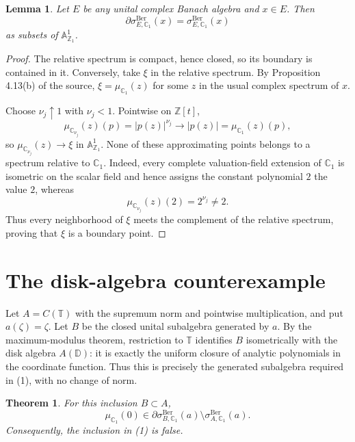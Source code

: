 \documentclass[11pt,a4paper]{article}
\newtheorem{theorem}{Theorem}
\newtheorem{lemma}{Lemma}
\newcommand{\C}{\mathbb C}
\newcommand{\D}{\mathbb D}
\newcommand{\T}{\mathbb T}
\newcommand{\Ber}{\mathrm{Ber}}
\begin{document}
\begin{lemma}\label{lem:boundary}
Let $E$ be any unital complex Banach algebra and $x\in E$.  Then
\[
 \partial\sigma^{\Ber}_{E,\C_1}(x)
 =\sigma^{\Ber}_{E,\C_1}(x)
\]
as subsets of $\mathbb A^1_{\mathbb Z_1}$.
\end{lemma}

\begin{proof}
The relative spectrum is compact, hence closed, so its boundary is contained
in it.  Conversely, take $\xi$ in the relative spectrum.  By Proposition
4.13(b) of the source,
$\xi=\mu_{\C_1}(z)$ for some $z$ in the usual complex spectrum of $x$.

Choose $\nu_j\uparrow1$ with $\nu_j<1$.  Pointwise on $\mathbb Z[t]$,
\[
 \mu_{\C_{\nu_j}}(z)(p)=|p(z)|^{\nu_j}\longrightarrow |p(z)|
 =\mu_{\C_1}(z)(p),
\]
so $\mu_{\C_{\nu_j}}(z)\to\xi$ in $\mathbb A^1_{\mathbb Z_1}$.
None of these approximating points belongs to a spectrum relative to
$\C_1$.  Indeed, every complete valuation-field extension of $\C_1$ is
isometric on the scalar field and hence assigns the constant polynomial $2$
the value $2$, whereas
\[
 \mu_{\C_{\nu_j}}(z)(2)=2^{\nu_j}\ne2.
\]
Thus every neighborhood of $\xi$ meets the complement of the relative
spectrum, proving that $\xi$ is a boundary point.
\end{proof}

\section{The disk-algebra counterexample}

Let $A=C(\T)$ with the supremum norm and pointwise multiplication, and put
$a(\zeta)=\zeta$.  Let $B$ be the closed unital subalgebra generated by $a$.
By the maximum-modulus theorem, restriction to $\T$ identifies $B$
isometrically with the disk algebra $A(\D)$: it is exactly the uniform closure
of analytic polynomials in the coordinate function.  Thus this is precisely
the generated subalgebra required in (1), with no change of norm.

\begin{theorem}
For this inclusion $B\subset A$,
\[
 \mu_{\C_1}(0)\in\partial\sigma^{\Ber}_{B,\C_1}(a)
 \setminus\sigma^{\Ber}_{A,\C_1}(a).
\]
Consequently, the inclusion in \emph{(1)} is false.
\end{theorem}
\end{document}

